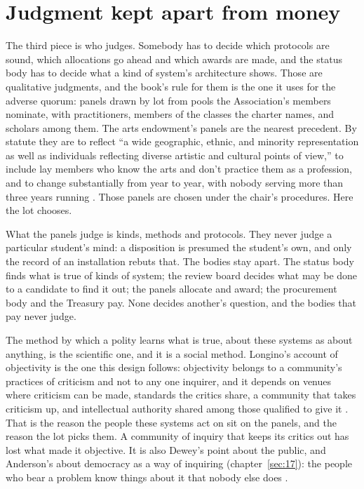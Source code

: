 \section{Judgment kept apart from money}
\label{sec:28.6}
The third piece is who judges. Somebody has to decide which protocols are sound, which allocations go ahead and which awards are made, and the status body has to decide what a kind of system's architecture shows. Those are qualitative judgments, and the book's rule for them is the one it uses for the adverse quorum: panels drawn by lot from pools the Association's members nominate, with practitioners, members of the classes the charter names, and scholars among them. The arts endowment's panels are the nearest precedent. By statute they are to reflect “a wide geographic, ethnic, and minority representation as well as individuals reflecting diverse artistic and cultural points of view,” to include lay members who know the arts and don't practice them as a profession, and to change substantially from year to year, with nobody serving more than three years running \autocite{us1965artsact}. Those panels are chosen under the chair's procedures. Here the lot chooses.

What the panels judge is kinds, methods and protocols. They never judge a particular student's mind: a disposition is presumed the student's own, and only the record of an installation rebuts that. The bodies stay apart. The status body finds what is true of kinds of system; the review board decides what may be done to a candidate to find it out; the panels allocate and award; the procurement body and the Treasury pay. None decides another's question, and the bodies that pay never judge.

The method by which a polity learns what is true, about these systems as about anything, is the scientific one, and it is a social method. Longino's account of objectivity is the one this design follows: objectivity belongs to a community's practices of criticism and not to any one inquirer, and it depends on venues where criticism can be made, standards the critics share, a community that takes criticism up, and intellectual authority shared among those qualified to give it \autocite{longino1990science}. That is the reason the people these systems act on sit on the panels, and the reason the lot picks them. A community of inquiry that keeps its critics out has lost what made it objective. It is also Dewey's point about the public, and Anderson's about democracy as a way of inquiring (chapter~\ref{sec:17}): the people who bear a problem know things about it that nobody else does \autocite{dewey1927public,anderson2006epistemology}.
